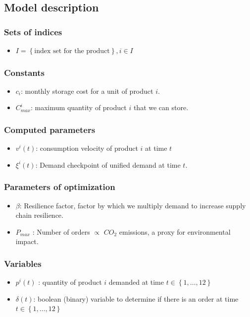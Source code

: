 \documentclass[11pt,twocolumn]{article}
\begin{document}
\subsection{Model description}
\subsubsection{Sets of indices}
\begin{itemize}
	\item $I = \left\{ \text{index set for the product} \right\}, i \in I $
\end{itemize}

\subsubsection{Constants}
\begin{itemize}
	\item $c_i$: monthly storage cost for a unit of product  $i$.
	\item $C_{max}^{i}$: maximum quantity of product $i$ that we can store.
\end{itemize}

\subsubsection{Computed parameters}
\begin{itemize}
	\item  $v^{i}\left( t \right) $: consumption velocity of product $i$ at time  $t$
	\item $\xi^{i}\left( t \right) $: Demand checkpoint of unified demand at time $t$.
\end{itemize}


\subsubsection{Parameters of optimization}
\begin{itemize}
	\item $\beta$: Resilience factor, factor by which we multiply demand to increase supply chain resilience.
	\item  $P_{max}$ : Number of orders $\propto$ $CO_2$ emissions, a proxy for environmental impact.
\end{itemize}

\subsubsection{Variables}
\begin{itemize}
	\item $p^{i}\left( t \right) $ : quantity of product $i$ demanded at time  $t \in \left\{ 1,\ldots,12 \right\} $
	\item  $\delta\left( t \right) $: boolean (binary) variable to determine if there is an order at time \qquad \qquad $t \in \left\{ 1,\ldots,12 \right\} $
\end{itemize}
\end{document}
